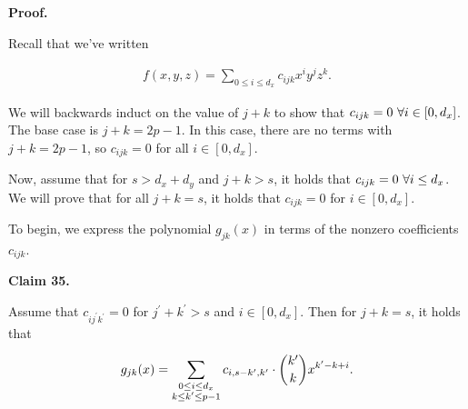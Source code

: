 \documentclass[10pt,a4paper]{article}
\begin{document}




\par\medskip\noindent\textbf{Proof.}\par




Recall that we’ve written\par


\[\begin{gathered}
f(x,y,z)=\sum_{0\leq i\leq d_{x}}c_{ijk}x^{i}y^{j}z^{k}.
\end{gathered}\]


We will backwards induct on the value of $j+k$ to show that $c_{ijk}=0\nobreak\ \forall i\in[0,d_{x}]$. The base case is $j+k=2p-1$. In this case, there are no terms with $j+k=2p-1$, so $c_{ijk}=0$ for all $i\in[0,d_{x}]$.\par




Now, assume that for $s>d_{x}+d_{y}$ and $j+k>s$, it holds that $c_{ijk}=0\nobreak\ \forall i\leq d_{x}$. We will prove that for all $j+k=s$, it holds that $c_{ijk}=0$ for $i\in[0,d_{x}]$.\par




To begin, we express the polynomial $g_{jk}(x)$ in terms of the nonzero coefficients $c_{ijk}$.\par





\par\medskip\noindent\textbf{
Claim 35. 
}\par



Assume that $c_{ij^{\prime}k^{\prime}}=0$ for $j^{\prime}+k^{\prime}>s$ and $i\in[0,d_{x}]$. Then for $j+k=s$, it holds that\par


\[\begin{gathered}
g_{jk}(x)=\sum_{\begin{subarray}{c}0\leq i\leq d_{x}\\
k\leq k^{\prime}\leq p-1\end{subarray}}c_{i,s-k^{\prime},k^{\prime}}\cdot\binom{k^{\prime}}{k}x^{k^{\prime}-k+i}.
\end{gathered}\]



\end{document}
